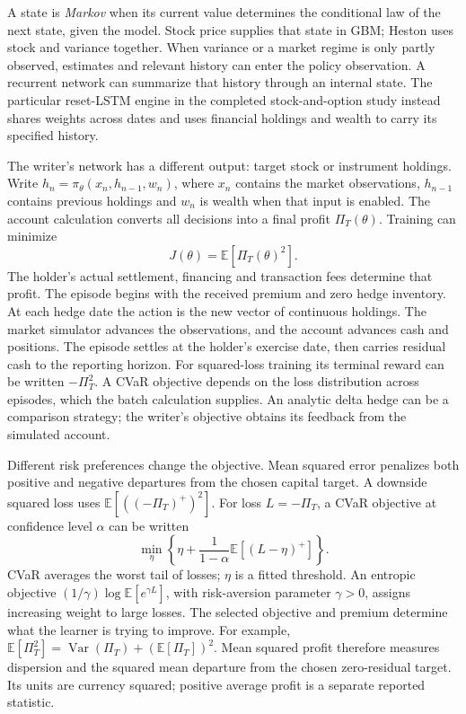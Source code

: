 \documentclass[8pt]{strategynet-journal}
\newcommand{\E}{\mathbb{E}}
\begin{document}
\begin{SNcolumns}
A state is \emph{Markov} when its current value determines the conditional
law of the next state, given the model. Stock price supplies that state in GBM;
Heston uses stock and variance together. When variance or a market regime is
only partly observed, estimates and relevant history can enter the policy
observation. A recurrent network can summarize that history through an
internal state. The particular reset-LSTM engine in the completed stock-and-option
study instead shares weights across dates and uses financial holdings and
wealth to carry its specified history.

The writer's network has a different output: target stock or instrument
holdings. Write $h_n=\pi_\theta(x_n,h_{n-1},w_n)$, where $x_n$ contains the
market observations, $h_{n-1}$ contains previous holdings and $w_n$ is wealth
when that input is enabled. The account calculation converts all decisions
into a final profit $\Pi_T(\theta)$. Training can minimize
\[
 J(\theta)=\E[\Pi_T(\theta)^2].
\]
The holder's actual settlement, financing and transaction fees determine that
profit. The episode begins with the received premium and zero hedge inventory.
At each hedge date the action is the new vector of continuous holdings. The
market simulator advances the observations, and the account advances cash and
positions. The episode settles at the holder's exercise date, then carries
residual cash to the reporting horizon. For squared-loss training its terminal
reward can be written $-\Pi_T^2$. A CVaR objective depends on the loss
distribution across episodes, which the batch calculation supplies. An analytic delta hedge can be a comparison strategy; the writer's
objective obtains its feedback from the simulated account.

Different risk preferences change the objective. Mean squared error penalizes
both positive and negative departures from the chosen capital target. A
downside squared loss uses $\E[((-\Pi_T)^+)^2]$. For loss $L=-\Pi_T$, a
CVaR objective at confidence level $\alpha$ can be written
\[
 \min_{\eta}\left\{\eta+
       \frac{1}{1-\alpha}\E[(L-\eta)^+]\right\}.
\]
CVaR averages the worst tail of losses; $\eta$ is a fitted threshold. An
entropic objective $(1/\gamma)\log\E[e^{\gamma L}]$, with risk-aversion
parameter $\gamma>0$, assigns increasing weight to large losses. The selected
objective and premium determine what the learner is trying to improve.
For example, $\E[\Pi_T^2]=\operatorname{Var}(\Pi_T)+(\E[\Pi_T])^2$.
Mean squared profit therefore measures dispersion and the squared mean departure
from the chosen zero-residual target. Its units are currency squared; positive
average profit is a separate reported statistic.


\end{SNcolumns}
\end{document}

